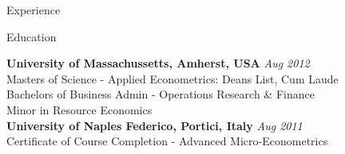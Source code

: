 \documentclass{resume} %
\begin{document}
\begin{rSection}{Experience}





%
\end{rSection}


\begin{rSection}{Education}

{\bf University of Massachussetts, Amherst, USA} \hfill {\em Aug 2012} \\
Masters of Science -  Applied Econometrics: Deans List, Cum Laude \\
Bachelors of Business Admin - Operations Research \& Finance \\
Minor in Resource Economics \\

{\bf University of Naples Federico, Portici, Italy} \hfill {\em Aug 2011} \\
Certificate of Course Completion - Advanced Micro-Econometrics \\

\end{rSection}
\end{document}
